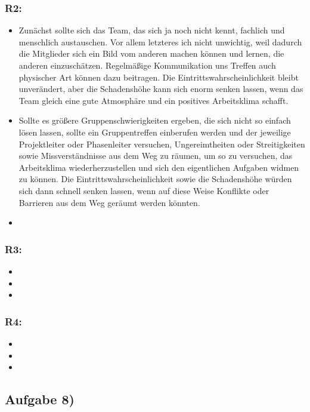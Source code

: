 \documentclass{swp1}
\begin{document}
\subsubsection*{R2:}
\begin{itemize}
\item Zunächst sollte sich das Team, das sich ja noch nicht kennt, fachlich und menschlich austauschen. Vor allem letzteres ich nicht unwichtig, weil dadurch die Mitglieder sich ein Bild vom anderen machen können und lernen, die anderen einzuschätzen. Regelmäßige Kommunikation uns Treffen auch physischer Art können dazu beitragen. Die Eintrittswahrscheinlichkeit bleibt unverändert, aber die Schadenshöhe kann sich enorm senken lassen, wenn das Team gleich eine gute Atmosphäre und ein positives Arbeitsklima schafft.
\item Sollte es größere Gruppenschwierigkeiten ergeben, die sich nicht so einfach lösen lassen, sollte ein Gruppentreffen einberufen werden und der jeweilige Projektleiter oder Phasenleiter versuchen, Ungereimtheiten oder Streitigkeiten sowie Missverständnisse aus dem Weg zu räumen, um so zu versuchen, das Arbeitsklima wiederherzustellen und sich den eigentlichen Aufgaben widmen zu können. Die Eintrittswahrscheinlichkeit sowie die Schadenshöhe würden sich dann schnell senken lassen, wenn auf diese Weise Konflikte oder Barrieren aus dem Weg geräumt werden könnten.
\item
\end{itemize}
\subsubsection*{R3:}
\begin{itemize}
\item 
\item
\item
\end{itemize}
\subsubsection*{R4:}
\begin{itemize}
\item 
\item
\item
\end{itemize}

\subsection*{Aufgabe 8)}
\end{document}
